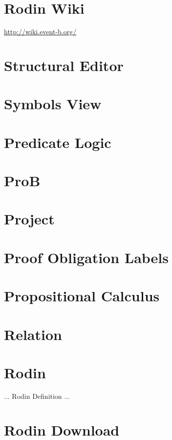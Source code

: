 \section{Rodin Wiki}
\label{rodin_wiki}

\url{http://wiki.event-b.org/}

\section{Structural Editor}
\label{structural_editor}

\section{Symbols View}
\label{symbols_view}

\section{Predicate Logic}
\label{predicate_logic}

\section{ProB}
\label{prob}

\section{Project}
\label{project}

\section{Proof Obligation Labels}
\label{po_labels}

\section{Propositional Calculus}
\label{propositional_calculus}

\section{Relation}
\label{relation}

\section{Rodin}
\label{rodin}

... Rodin Definition ...

\section{Rodin Download}
\label{rodin_download}

